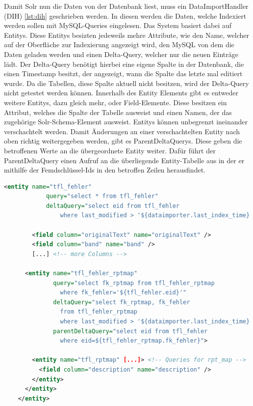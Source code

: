 Damit Solr nun die Daten von der Datenbank liest, muss ein DataImportHandler (DIH) \ref{lst:dih} geschrieben werden. In diesen werden die Daten, welche Indexiert werden sollen mit MySQL-Queries eingelesen. Das System basiert dabei auf Entitys. Diese Entitys besizten jedeweils mehre Attribute, wie den Name, welcher auf der Oberfläche zur Indexierung angezeigt wird, den MySQL von dem die Daten geladen werden und einen Delta-Query, welcher nur die neuen Einträge lädt. Der Delta-Query benötigt hierbei eine eigene Spalte in der Datenbank, die einen Timestamp besitzt, der angezeigt, wann die Spalte das letzte mal editiert wurde. Da die Tabellen, diese Spalte aktuell nicht besitzen, wird der Delta-Query nicht getestet werden können. Innerhalb des Entity Elements gibt es entweder weitere Entitys, dazu gleich mehr, oder Field-Elemente. Diese besitzen ein Attribut, welches die Spalte der Tabelle ausweist und einen Namen, der das zugehörige Solr-Schema-Element ausweist. Entitys können unbegrenzt ineinander verschachtelt werden. Damit Änderungen an einer verschachtelten Entity nach oben richtig weitergegeben werden, gibt es ParentDeltaQuerys. Diese geben die betroffenen Werte an die übergeordnete Entity weiter. Dafür führt der ParentDeltaQuery einen Aufruf an die überliegende Entity-Tabelle aus in der er mithilfe der Femdschlüssel-Ids in den betroffen Zeilen herausfindet.

\begin{lstlisting}[language=xml, frame=single, label={lst:dih}, 
    morekeywords={entity,query,deltaQuery,parentDeltaQuery,field,column, name}] 
    <entity name="tfl_fehler" 
            query="select * from tfl_fehler" 
            deltaQuery="select eid from tfl_fehler 
                where last_modified > '${dataimporter.last_index_time}'"> 

		<field column="originalText" name="originalText" />
		<field column="band" name="band" />
        [...] <!-- more Columns -->

      <entity name="tfl_fehler_rptmap"
              query="select fk_rptmap from tfl_fehler_rptmap 
                where fk_fehler='${tfl_fehler.eid}'"
              deltaQuery="select fk_rptmap, fk_fehler 
                from tfl_fehler_rptmap 
                where last_modified > '${dataimporter.last_index_time}'"
              parentDeltaQuery="select eid from tfl_fehler
                where eid=${tfl_fehler_rptmap.fk_fehler}">

        <entity name="tfl_rptmap" [...]> <!-- Queries for rpt_map -->
          <field column="description" name="description" />
        </entity>
      </entity>
    </entity>
\end{lstlisting}

